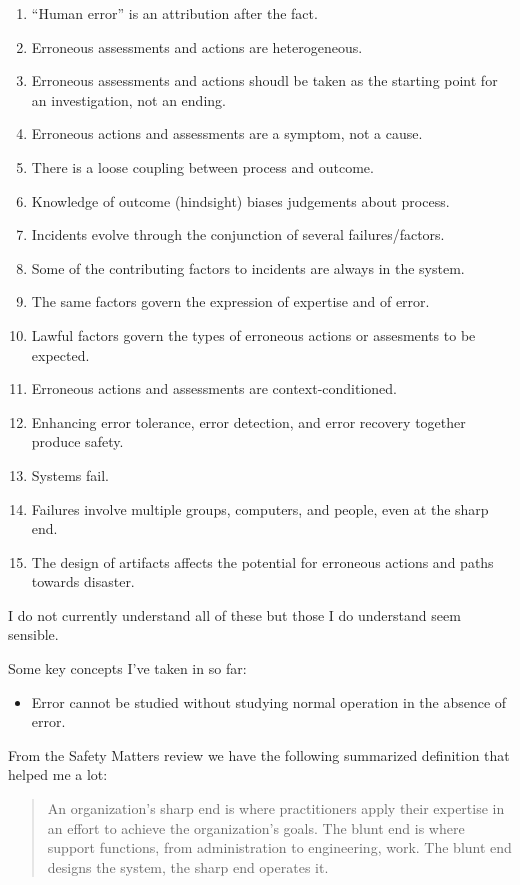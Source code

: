 \documentclass[a4paper]{book}
\begin{document}
\begin{enumerate}
\item ``Human error'' is an attribution after the fact.
\item Erroneous assessments and actions are heterogeneous.
\item Erroneous assessments and actions shoudl be taken as the starting point for an investigation, not an ending.
\item Erroneous actions and assessments are a symptom, not a cause.
\item There is a loose coupling between process and outcome.
\item Knowledge of outcome (hindsight) biases judgements about process.
\item Incidents evolve through the conjunction of several failures/factors.
\item Some of the contributing factors to incidents are always in the system.
\item The same factors govern the expression of expertise and of error.
\item Lawful factors govern the types of erroneous actions or assesments to be expected.
\item Erroneous actions and assessments are context-conditioned.
\item Enhancing error tolerance, error detection, and error recovery together produce safety.
\item Systems fail.
\item Failures involve multiple groups, computers, and people, even at the sharp end.
\item The design of artifacts affects the potential for erroneous actions and paths towards disaster.
\end{enumerate}

I do not currently understand all of these but those I do understand seem sensible.

Some key concepts I've taken in so far:

\begin{itemize}
\item Error cannot be studied without studying normal operation in the absence of error.
\end{itemize}

From the Safety Matters review we have the following summarized definition that helped me a lot:

\begin{quotation}
An organization's sharp end is where practitioners apply their expertise in an effort to achieve the organization's goals.  The blunt end is where support functions, from administration to engineering, work.  The blunt end designs the system, the sharp end operates it.
\end{quotation}
\end{document}
